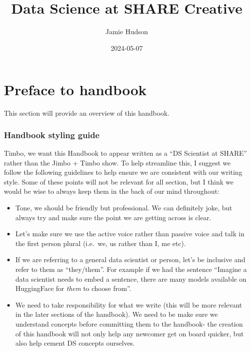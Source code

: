 \documentclass[
  letterpaper,
  DIV=11,
  numbers=noendperiod]{scrreprt}
\title{Data Science at SHARE Creative}
\author{Jamie Hudson}
\date{2024-05-07}
\providecommand{\tightlist}{%
  \setlength{\itemsep}{0pt}\setlength{\parskip}{0pt}}\usepackage{longtable,booktabs,array}
\renewcommand*\contentsname{Table of contents}
\newcommand\contentsname{Table of contents}
\begin{document}
\maketitle

\renewcommand*\contentsname{Table of contents}
{
\hypersetup{linkcolor=}
\setcounter{tocdepth}{2}
\tableofcontents
}

\chapter*{Preface to handbook}\label{preface-to-handbook}


This section will provide an overview of this handbook.

\subsection*{Handbook styling guide}\label{handbook-styling-guide}

Timbo, we want this Handbook to appear written as a ``DS Scientist at
SHARE'' rather than the Jimbo + Timbo show. To help streamline this, I
suggest we follow the following guidelines to help ensure we are
consistent with our writing style. Some of these points will not be
relevant for all section, but I think we would be wise to always keep
them in the back of our mind throughout:

\begin{itemize}
\tightlist
\item
  Tone, we should be friendly but professional. We can definitely joke,
  but always try and make sure the point we are getting across is clear.
\item
  Let's make sure we use the active voice rather than passive voice and
  talk in the first person plural (i.e.~we, us rather than I, me etc).
\item
  If we are referring to a general data scientist or person, let's be
  inclusive and refer to them as ``they/them''. For example if we had
  the sentence ``Imagine a data scientist needs to embed a sentence,
  there are many models available on HuggingFace for \emph{them} to
  choose from''.
\item
  We need to take responsibility for what we write (this will be more
  relevant in the later sections of the handbook). We need to be make
  sure we understand concepts before committing them to the handbook-
  the creation of this handbook will not only help any newcomer get on
  board quicker, but also help cement DS concepts ourselves.
\end{itemize}
\end{document}
